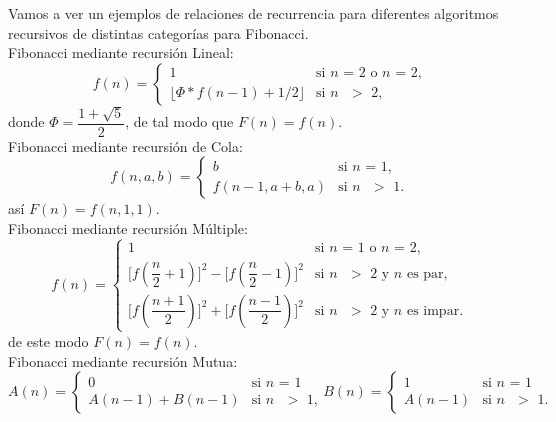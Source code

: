 \documentclass[12pt,twoside]{article}
\begin{document}
\newpage
Vamos a ver un ejemplos de relaciones de recurrencia para diferentes algoritmos recursivos de distintas categorías para Fibonacci.
\newline
\\ Fibonacci mediante recursión Lineal:
\begin{equation}
    f(n)=
    \begin{cases}
        1 &\text{si $n$ = 2 o $n$ = 2,} \\
        \lfloor \Phi * f(n-1)+1/2 \rfloor &\text{si $n$ $>$ 2,}
    \end{cases}
\end{equation}
donde $\Phi=\dfrac{1+\sqrt{5}}{2}$, de tal modo que $F(n)=f(n)$.
\newline
\\ Fibonacci mediante recursión de Cola:
\begin{equation}
    f(n,a,b)=
    \begin{cases}
        b &\text{si $n$ = 1,} \\
        f(n-1,a+b,a) &\text{si $n$ $>$ 1.}
    \end{cases}
\end{equation}
así $F(n)=f(n,1,1)$.
\newline
\\ Fibonacci mediante recursión Múltiple:
\begin{equation}
    f(n)=
    \begin{cases}
        1 &\text{si $n$ = 1 o $n$ = 2,} \\
        \text{[$f(\dfrac{n}{2}+1)]^2$} - \text{[$f(\dfrac{n}{2}-1)]^2$}  &\text{si $n$ $>$ 2 y $n$ es par,} \\
        \text{[$f(\dfrac{n+1}{2})]^2$} + \text{[$f(\dfrac{n-1}{2})]^2$}  &\text{si $n$ $>$ 2 y $n$ es impar.}
    \end{cases}
\end{equation}
de este modo $F(n)=f(n)$.
\newline
\\ Fibonacci mediante recursión Mutua:
\begin{equation}
    A(n)=
    \begin{cases}
        0 &\text{si $n$ = 1} \\
        A(n-1)+B(n-1) &\text{si $n$ $>$ 1,}
    \end{cases}
    B(n)=
    \begin{cases}
        1 &\text{si $n$ = 1} \\
        A(n-1) &\text{si $n$ $>$ 1.}
    \end{cases}
\end{equation}
\end{document}
